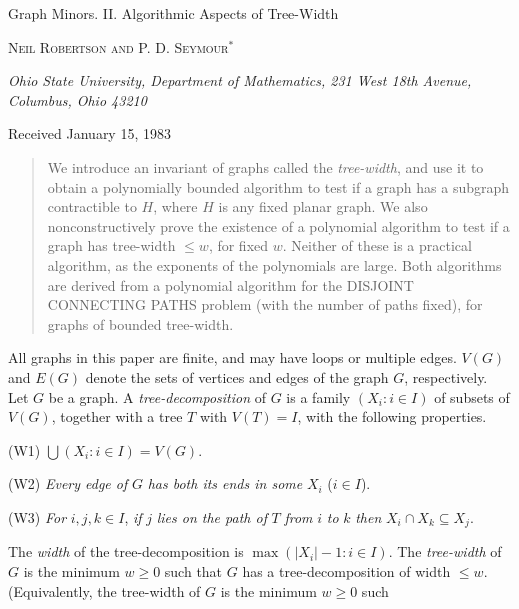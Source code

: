{\centering
\medskip
{\Large Graph Minors. II. Algorithmic Aspects of Tree-Width\par}
{\textsc{Neil Robertson and P. D. Seymour}$^*$\par}
{\itshape Ohio State University, Department of Mathematics, 231 West 18th Avenue,\\
Columbus, Ohio 43210\par}
{Received January 15, 1983\par}
}

\begin{quote}
We introduce an invariant of graphs called the \textit{tree-width}, and use it to obtain a
polynomially bounded algorithm to test if a graph has a subgraph contractible to $H$,
where $H$ is any fixed planar graph. We also nonconstructively prove the existence of
a polynomial algorithm to test if a graph has tree-width $\le w$, for fixed $w$. Neither of
these is a practical algorithm, as the exponents of the polynomials are large. Both
algorithms are derived from a polynomial algorithm for the DISJOINT CONNECTING PATHS problem (with the number of paths fixed), for graphs of bounded
tree-width.
\end{quote}


All graphs in this paper are finite, and may have loops or multiple edges. $V(G)$ and $E(G)$ denote the sets of vertices and edges of the graph $G$, respectively. Let $G$ be a graph. A \textit{tree-decomposition} of $G$ is a family $(X_i : i \in I)$ of subsets of $V(G)$, together with a tree $T$ with $V(T) = I$, with the following properties.

\hspace*{12pt}(W1) $\bigcup(X_i : i \in I) = V(G)$.

\hspace*{12pt}(W2) \textit{Every edge of} $G$ \textit{has both its ends in some} $X_i$ ($i \in I$).

\hspace*{12pt}(W3) \textit{For} $i, j, k \in I$, \textit{if} $j$ \textit{lies on the path of} $T$ \textit{from} $i$ \textit{to} $k$ \textit{then} $X_i \cap X_k \subseteq X_j$.

The \textit{width} of the tree-decomposition is $\max(|X_i| - 1 : i \in I)$. The \textit{tree-width} of $G$ is the minimum $w \ge 0$ such that $G$ has a tree-decomposition of width $\le w$. (Equivalently, the tree-width of $G$ is the minimum $w \ge 0$ such%
